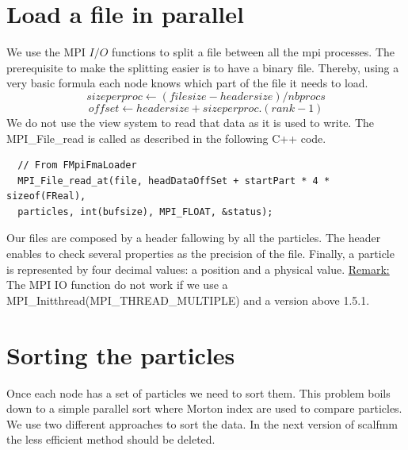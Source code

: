 \documentclass[12pt,letterpaper,titlepage]{report}
\begin{document}
\section{Load a file in parallel}
We use the MPI $I/O$ functions to split a file between all the mpi
processes.  The prerequisite to make the splitting easier is to have a
binary file.  Thereby, using a very basic formula each node knows
which part of the file it needs to load.
\begin{equation}
  size per proc \leftarrow \left (file size - header size \right ) / nbprocs
\end{equation}
\begin{equation}
  offset \leftarrow header size + size per proc .\left ( rank - 1 \right )
\end{equation}
\newline
We do not use the view system to read that data as it is used to
write. The MPI\_File\_read is called as described in the following
C++ code.
\begin{lstlisting}
  // From FMpiFmaLoader
  MPI_File_read_at(file, headDataOffSet + startPart * 4 * sizeof(FReal),
  particles, int(bufsize), MPI_FLOAT, &status);
\end{lstlisting}
Our files are composed by a header fallowing by all the particles.
The header enables to check several properties as the precision of the file.
Finally, a particle is represented by four decimal values: a position and a physical value.
\newline
\underline{Remark:} The MPI IO function do not work if we use a MPI\_Initthread(MPI\_THREAD\_MULTIPLE) and a version above 1.5.1.

\section{Sorting the particles}
Once each node has a set of particles we need to sort them.  This
problem boils down to a simple parallel sort where Morton index are
used to compare particles.  We use two different approaches to sort
the data.  In the next version of scalfmm the less efficient method
should be deleted.
\end{document}
